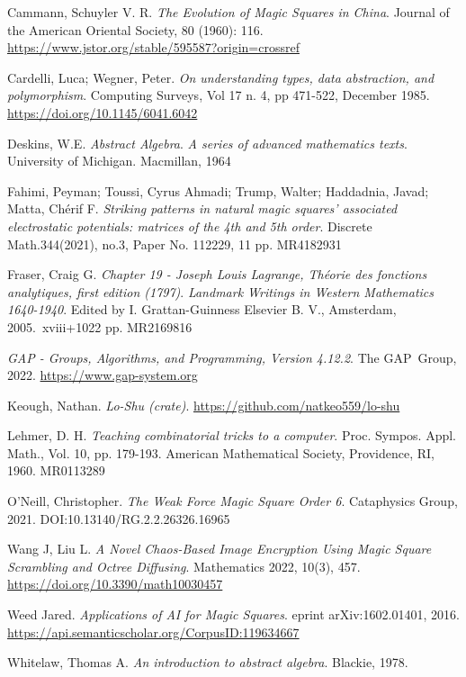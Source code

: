 \documentclass{rhumj_new}
\begin{document}
\begin{thebibliography}{10}
  Cammann, Schuyler V. R.
    {\it The Evolution of Magic Squares in China}.
  Journal of the American Oriental Society, 80 (1960): 116.
  \url{https://www.jstor.org/stable/595587?origin=crossref}

  Cardelli, Luca; Wegner, Peter.
    {\it On understanding types, data abstraction, and polymorphism}.
  Computing Surveys, Vol 17 n. 4, pp 471-522, December 1985.
  \url{https://doi.org/10.1145/6041.6042}

  Deskins, W.E.
    {\it Abstract Algebra}.
  {\it A series of advanced mathematics texts}.
  University of Michigan.
  Macmillan, 1964

  Fahimi, Peyman; Toussi, Cyrus Ahmadi; Trump, Walter; Haddadnia, Javad; Matta, Chérif F.
    {\it Striking patterns in natural magic squares' associated electrostatic potentials:
      matrices of the 4th and 5th order}.
  Discrete Math.344(2021), no.3, Paper No. 112229, 11 pp.
  MR4182931

  Fraser, Craig G.
    {\it Chapter 19 - Joseph Louis Lagrange, Théorie des fonctions analytiques, first edition
      (1797)}.
  {\it Landmark Writings in Western Mathematics 1640-1940}.
  Edited by I. Grattan-Guinness Elsevier B. V., Amsterdam, 2005.\ xviii+1022 pp.
  MR2169816

  {\it GAP - Groups, Algorithms, and Programming, Version 4.12.2}.
  The GAP~Group, 2022.
  \url{https://www.gap-system.org}

  Keough, Nathan.
    {\it Lo-Shu (crate)}.
  \url{https://github.com/natkeo559/lo-shu}

  Lehmer, D. H.
    {\it Teaching combinatorial tricks to a computer}.
  Proc. Sympos. Appl. Math., Vol. 10, pp. 179-193.
  American Mathematical Society, Providence, RI, 1960.
  MR0113289

  O'Neill, Christopher.
    {\it The Weak Force Magic Square Order 6}.
  Cataphysics Group, 2021.
  DOI:10.13140/RG.2.2.26326.16965

  Wang J, Liu L.
    {\it A Novel Chaos-Based Image Encryption Using Magic Square Scrambling and Octree Diffusing}.
  Mathematics 2022, 10(3), 457.
  \url{https://doi.org/10.3390/math10030457}

  Weed Jared.
    {\it Applications of AI for Magic Squares}.
  eprint arXiv:1602.01401, 2016.
  \url{https://api.semanticscholar.org/CorpusID:119634667}

  Whitelaw, Thomas A.
    {\it An introduction to abstract algebra}.
  Blackie, 1978.

\end{thebibliography}
\end{document}
